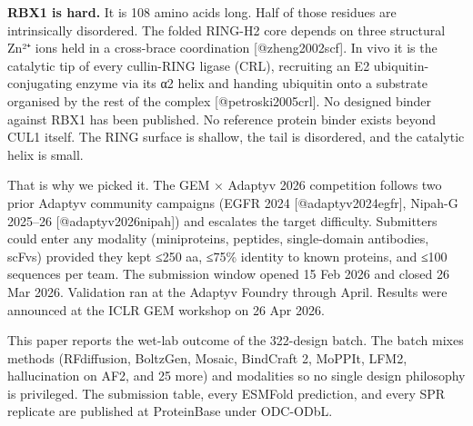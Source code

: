 \textbf{RBX1 is hard.} It is 108 amino acids long. Half of those
residues are intrinsically disordered. The folded RING-H2 core depends
on three structural Zn²⁺ ions held in a cross-brace coordination
{[}@zheng2002scf{]}. In vivo it is the catalytic tip of every cullin-RING
ligase (CRL), recruiting an E2 ubiquitin-conjugating enzyme via its α2
helix and handing ubiquitin onto a substrate organised by the rest of
the complex {[}@petroski2005crl{]}. No designed binder against RBX1
has been published. No reference protein binder exists beyond CUL1
itself. The RING surface is shallow, the tail is disordered, and the
catalytic helix is small.

That is why we picked it. The GEM × Adaptyv 2026 competition follows two
prior Adaptyv community campaigns (EGFR 2024 {[}@adaptyv2024egfr{]},
Nipah-G 2025--26 {[}@adaptyv2026nipah{]}) and escalates the target
difficulty. Submitters could enter any modality (miniproteins, peptides,
single-domain antibodies, scFvs) provided they kept ≤250 aa, ≤75\%
identity to known proteins, and ≤100 sequences per team. The submission
window opened 15 Feb 2026 and closed 26 Mar 2026. Validation ran at the
Adaptyv Foundry through April. Results were announced at the ICLR GEM
workshop on 26 Apr 2026.

This paper reports the wet-lab outcome of the 322-design batch. The
batch mixes methods (RFdiffusion, BoltzGen, Mosaic, BindCraft 2, MoPPIt,
LFM2, hallucination on AF2, and 25 more) and modalities so no single
design philosophy is privileged. The submission table, every ESMFold
prediction, and every SPR replicate are published at ProteinBase under
ODC-ODbL.
